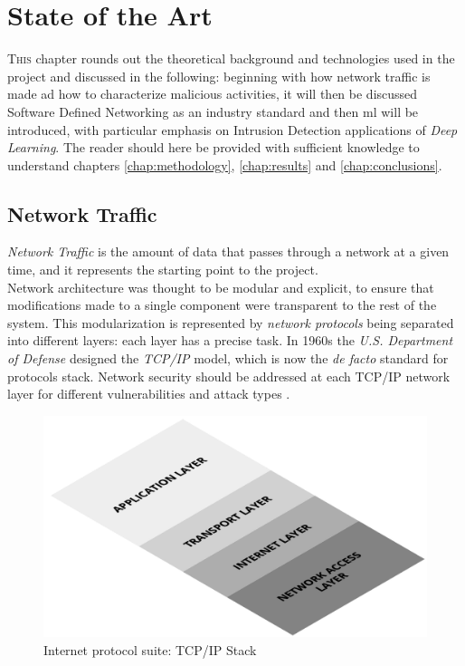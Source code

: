 \chapter{State of the Art}
\label{chap:state-of-the-art}

\lettrine[lines=3, findent=3pt, nindent=0pt]{T}{his} chapter rounds out the theoretical background and technologies used in the project and discussed in the following: beginning with how network traffic is made ad how to characterize malicious activities, it will then be discussed Software Defined Networking as an industry standard and then \gls{ml} will be introduced, with particular emphasis on Intrusion Detection applications of \textit{Deep Learning}. The reader should here be provided with sufficient knowledge to understand chapters \ref{chap:methodology}, \ref{chap:results} and \ref{chap:conclusions}.


\section{Network Traffic}
\label{sec:network-traffic}

\textit{Network Traffic} is the amount of data that passes through a network at a given time, and it represents the starting point to the project. \\ Network architecture was thought to be modular and explicit, to ensure that modifications made to a single component were transparent to the rest of the system. This modularization is represented by \textit{network protocols} being separated into different layers: each layer has a precise task. In 1960s the \textit{U.S. Department of Defense} designed the \textit{TCP/IP} model, which is now the \textit{de facto} standard for protocols stack. Network security should be addressed at each TCP/IP network layer for different vulnerabilities and attack types \cite{Zaman2009}.

\begin{figure}[h!]
    \centering
    \includegraphics[scale=0.23]{assets/figures/chapter2/TCP_IP Stack.png}
    \caption{Internet protocol suite: TCP/IP Stack}
    \label{fig:TCP/IP-stack}
\end{figure}

